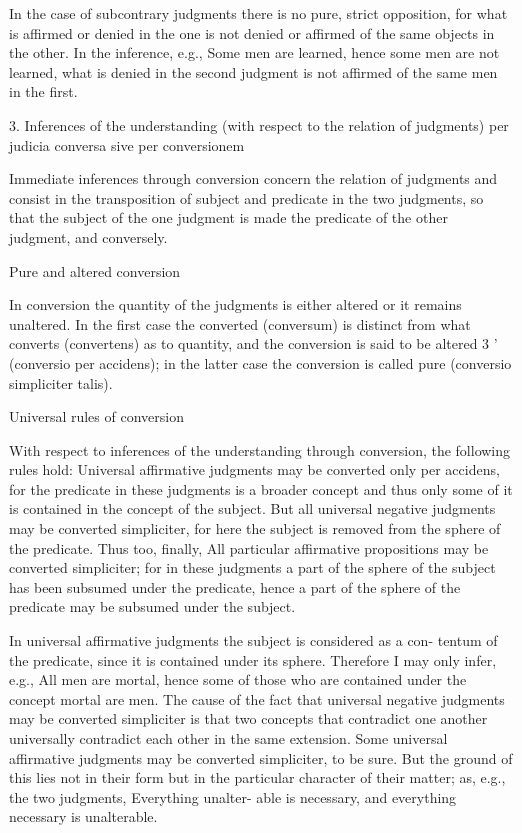     In the case of subcontrary judgments there is no pure, strict opposition,
    for what is affirmed or denied in the one is not denied or affirmed of the same
    objects in the other.
    In the inference, e.g., Some men are learned, hence some men are not learned,
    what is denied in the second judgment is not affirmed of the same men in the first.

3. Inferences of the understanding
(with respect to the relation of judgments)
per judicia conversa sive per conversionem

Immediate inferences through conversion concern the relation of judgments and
consist in the transposition of subject and predicate in the two judgments,
so that the subject of the one judgment is made
the predicate of the other judgment, and conversely.

Pure and altered conversion

In conversion the quantity of the judgments is either altered or it remains
unaltered. In the first case the converted (conversum) is distinct from what
converts (convertens) as to quantity, and the conversion is said to be altered 3 '
(conversio per accidens); in the latter case the conversion is called pure
(conversio simpliciter talis).

Universal rules of conversion

With respect to inferences of the understanding through conversion,
the following rules hold:
Universal affirmative judgments may be converted only per accidens,
for the predicate in these judgments is a broader concept and thus
only some of it is contained in the concept of the subject.
But all universal negative judgments may be converted simpliciter,
for here the subject is removed from the sphere of the predicate.
Thus too, finally,
All particular affirmative propositions may be converted simpliciter;
for in these judgments
a part of the sphere of the subject has been subsumed under the predicate,
hence a part of the sphere of the predicate may be subsumed under the subject.

    In universal affirmative judgments the subject is considered as a con-
    tentum of the predicate, since it is contained under its sphere. Therefore I
    may only infer, e.g., All men are mortal, hence some of those who are
    contained under the concept mortal are men. The cause of the fact that
    universal negative judgments may be converted simpliciter is that two
    concepts that contradict one another universally contradict each other in
    the same extension.
    Some universal affirmative judgments may be converted simpliciter, to be
    sure. But the ground of this lies not in their form but in the particular
    character of their matter; as, e.g., the two judgments, Everything unalter-
    able is necessary, and everything necessary is unalterable.


